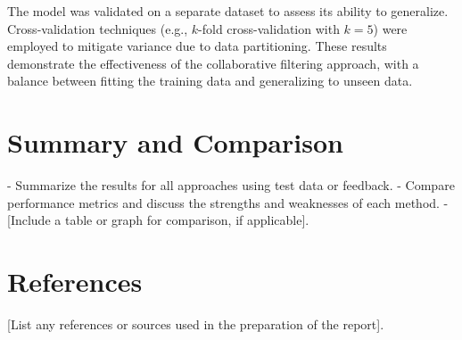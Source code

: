 \documentclass[a3paper,12pt]{article}
\begin{document}
The model was validated on a separate dataset to assess its ability to generalize.
Cross-validation techniques (e.g., \(k\)-fold cross-validation with \(k=5\)) were employed to mitigate variance due to data partitioning.
These results demonstrate the effectiveness of the collaborative filtering approach, with a balance between
fitting the training data and generalizing to unseen data.

\section{Summary and Comparison}
- Summarize the results for all approaches using test data or feedback.
- Compare performance metrics and discuss the strengths and weaknesses of each method.
- [Include a table or graph for comparison, if applicable].

\section*{References}
[List any references or sources used in the preparation of the report].
\end{document}
